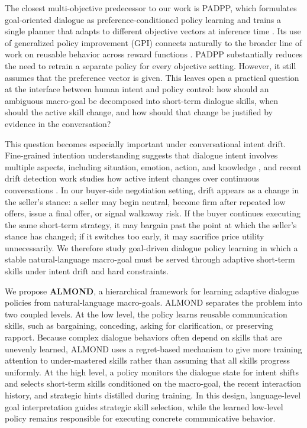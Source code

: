 The closest multi-objective predecessor to our work is PADPP, which formulates
goal-oriented dialogue as preference-conditioned policy learning and trains a
single planner that adapts to different objective vectors at inference time
\cite{dao-liao-2025-one}. Its use of generalized policy improvement (GPI)
connects naturally to the broader line of work on reusable behavior across
reward functions \cite{barreto2017successor,barreto2018transfer}. PADPP
substantially reduces the need to retrain a separate policy for every objective
setting. However, it still assumes that the preference vector is given. This
leaves open a practical question at the interface between human intent and
policy control: how should an ambiguous macro-goal be decomposed into
short-term dialogue skills, when should the active skill change, and how should
that change be justified by evidence in the conversation?

This question becomes especially important under conversational intent drift.
Fine-grained intention understanding suggests that dialogue intent involves
multiple aspects, including situation, emotion, action, and knowledge
\cite{liang-etal-2025-intentionframe}, and recent drift detection work studies
how active intent changes over continuous conversations
\cite{wang2025detecting}. In our buyer-side negotiation setting, drift appears
as a change in the seller's stance: a seller may begin neutral, become firm
after repeated low offers, issue a final offer, or signal walkaway risk. If the
buyer continues executing the same short-term strategy, it may bargain past the
point at which the seller's stance has changed; if it switches too early, it
may sacrifice price utility unnecessarily. We therefore study goal-driven
dialogue policy learning in which a stable natural-language macro-goal must be
served through adaptive short-term skills under intent drift and hard
constraints.

We propose \textbf{ALMOND}, a hierarchical framework for learning adaptive
dialogue policies from natural-language macro-goals. ALMOND separates the
problem into two coupled levels. At the low level, the policy learns reusable
communication skills, such as bargaining, conceding, asking for clarification,
or preserving rapport. Because complex dialogue behaviors often depend on
skills that are unevenly learned, ALMOND uses a regret-based mechanism to give
more training attention to under-mastered skills rather than assuming that all
skills progress uniformly. At the high level, a policy monitors the dialogue
state for intent shifts and selects short-term skills conditioned on the
macro-goal, the recent interaction history, and strategic hints distilled
during training. In this design, language-level goal interpretation guides
strategic skill selection, while the learned low-level policy remains
responsible for executing concrete communicative behavior.

